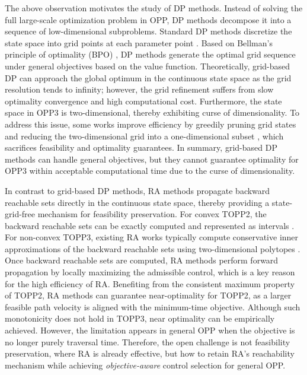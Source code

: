 \documentclass[journal]{IEEEtran}
\theoremstyle{definition}
\theoremstyle{definition}
\begin{document}
The above observation motivates the study of DP methods. Instead of solving the full large-scale optimization problem in OPP, DP methods decompose it into a sequence of low-dimensional subproblems. Standard DP methods discretize the state space into grid points at each parameter point \cite{shin1986dynamic}. Based on Bellman's principle of optimality (BPO) \cite{bellman1952theory}, DP methods generate the optimal grid sequence under general objectives based on the value function. Theoretically, grid-based DP can approach the global optimum in the continuous state space as the grid resolution tends to infinity; however, the grid refinement suffers from slow optimality convergence and high computational cost. Furthermore, the state space in OPP3 is two-dimensional, thereby exhibiting curse of dimensionality. To address this issue, some works improve efficiency by greedily pruning grid states and reducing the two-dimensional grid into a one-dimensional subset \cite{kaserer2019nearly}, which sacrifices feasibility and optimality guarantees. In summary, grid-based DP methods can handle general objectives, but they cannot guarantee optimality for OPP3 within acceptable computational time due to the curse of dimensionality.

In contrast to grid-based DP methods, RA methods propagate backward reachable sets directly in the continuous state space, thereby providing a state-grid-free mechanism for feasibility preservation. For convex TOPP2, the backward reachable sets can be exactly computed and represented as intervals \cite{pham2018new,consolini2019optimal}. For non-convex TOPP3, existing RA works typically compute conservative inner approximations of the backward reachable sets using two-dimensional polytopes \cite{dio2025time}. Once backward reachable sets are computed, RA methods perform forward propagation by locally maximizing the admissible control, which is a key reason for the high efficiency of RA. Benefiting from the consistent maximum property of TOPP2, RA methods can guarantee near-optimality for TOPP2, as a larger feasible path velocity is aligned with the minimum-time objective. Although such monotonicity does not hold in TOPP3, near optimality can be empirically achieved. However, the limitation appears in general OPP when the objective is no longer purely traversal time. Therefore, the open challenge is not feasibility preservation, where RA is already effective, but how to retain RA's reachability mechanism while achieving \textit{objective-aware} control selection for general OPP.
\end{document}
